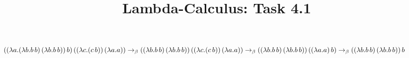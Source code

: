 \documentclass{article}
\title{Lambda-Calculus: Task 4.1}
\begin{document}
$
\\*((\lambda a.(\lambda b.b\,b)\,(\lambda b.b\,b))\,b)\,((\lambda c.(c\,b))\,(\lambda a.a))\to_\beta
\\*((\lambda b.b\,b)\,(\lambda b.b\,b))\,((\lambda c.(c\,b))\,(\lambda a.a))\to_\beta
\\*((\lambda b.b\,b)\,(\lambda b.b\,b))\,((\lambda a.a)\,b)\to_\beta 
\\*((\lambda b.b\,b)\,(\lambda b.b\,b))\,b
$
\end{document}
